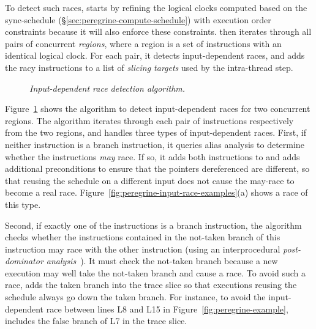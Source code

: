 To detect such races, \peregrine starts by refining the logical clocks computed
based on the sync-schedule (\S\ref{sec:peregrine-compute-schedule}) with
execution order constraints because it will also enforce these
constraints.  \peregrine then iterates through all pairs
of concurrent \emph{regions}, where a region is a set of instructions with an identical
logical clock.  For each pair, it detects input-dependent races, and adds
the racy instructions to a list of \emph{slicing targets} used by the
intra-thread step.

\begin{figure}[!ht]
\vspace{-.3in}
\begin{minipage}[t]{\textwidth}
\tiny  {}
\end{minipage}
\vspace{-.2in}
\caption{{\em Input-dependent race detection
    algorithm.}} \label{fig:peregrine-detect-input-race}
\vspace{-.1in}
\end{figure}

Figure~\ref{fig:peregrine-detect-input-race} shows the algorithm to detect
input-dependent races for two concurrent regions.  The algorithm iterates
through each pair of instructions respectively from the
two regions, and handles three types of input-dependent races.  First, if
neither instruction is a branch instruction, it queries alias analysis to
determine whether the instructions \emph{may} race.  If so, it adds both
instructions to  and adds additional
preconditions to ensure that the pointers dereferenced are different, so
that reusing the schedule on a different input does not cause the may-race
to become a real race.  Figure~\ref{fig:peregrine-input-race-examples}(a) shows
a race of this type.

Second, if exactly one of the instructions is a branch instruction, the
algorithm checks whether the instructions contained in the not-taken
branch of this instruction may race with the other instruction
(using an interprocedural \emph{post-dominator analysis}~\cite{aho:dragon:06}).
It must check the not-taken branch because a new
execution may well take the not-taken branch and cause a race.  To avoid such a
race, \peregrine adds the taken branch into the trace slice so that executions
reusing the schedule always go down the taken branch.  For instance, to
avoid the input-dependent race between lines L8 and L15
in Figure~\ref{fig:peregrine-example}, \peregrine includes
the false branch of L7 in the trace slice.

